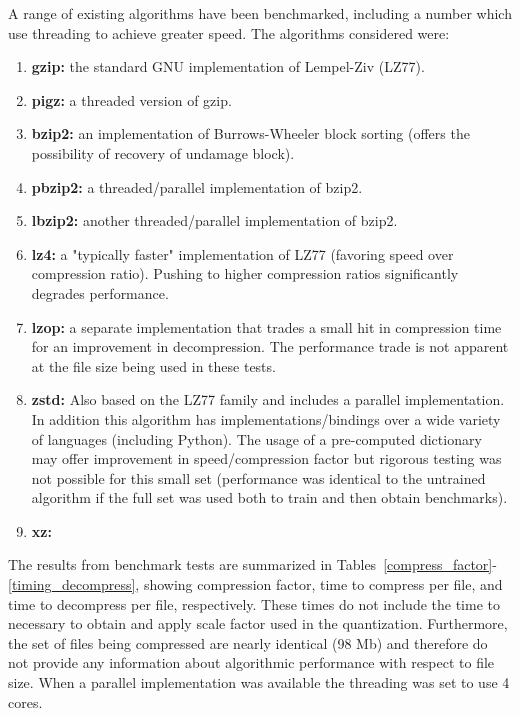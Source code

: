 A range of existing algorithms have been benchmarked, including a number which use threading to achieve 
greater speed.  The algorithms considered were:
\begin{enumerate}
\item {\bf gzip:} the standard GNU implementation of Lempel-Ziv (LZ77).
\item {\bf pigz:} a threaded version of gzip.
\item {\bf bzip2:} an implementation of Burrows-Wheeler block sorting (offers the possibility of recovery of undamage block).
\item {\bf pbzip2:} a threaded/parallel implementation of bzip2.
\item {\bf lbzip2:} another threaded/parallel implementation of bzip2.
\item {\bf lz4:} a "typically faster" implementation of LZ77 (favoring speed over compression ratio). Pushing to higher compression ratios significantly degrades performance.
\item {\bf lzop:} a separate implementation that trades a small hit in compression time for an improvement in decompression.  The performance trade is not apparent at the file size being used in these tests.
\item {\bf zstd:} Also based on the LZ77 family and includes a parallel implementation.  In addition this
algorithm has implementations/bindings over a wide variety of languages (including Python).  
The usage of a pre-computed dictionary may offer improvement in speed/compression factor but 
rigorous testing was not possible for this small set (performance was identical to the untrained
algorithm if the full set was used both to train and then obtain benchmarks).
\item {\bf xz:} 
\end{enumerate}

The results from benchmark tests are summarized in Tables~\ref{compress_factor}-\ref{timing_decompress}, 
showing compression factor, time to compress per file, and time to decompress per file, respectively.
These times do not include the time to necessary to obtain and apply scale factor used in the quantization.  Furthermore, the set of files being compressed are nearly identical (98 Mb) and therefore do not provide 
any information about algorithmic performance with respect to file size.  When a parallel implementation
was available the threading was set to use 4 cores.


